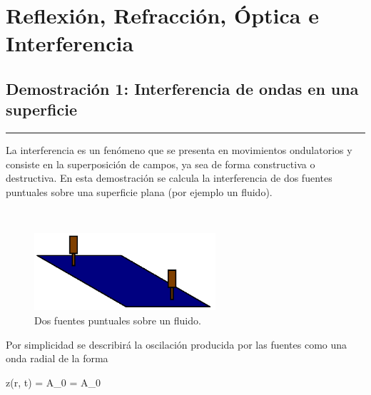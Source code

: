 \chapter{Reflexión, Refracción, Óptica e Interferencia}
\label{cha:optic}





\section{Demostración 1: Interferencia de ondas en una superficie}
\label{sec:DEMO4_01}
\rule{14cm}{0.5mm}

La interferencia es un fenómeno que se presenta en movimientos ondulatorios
y consiste en la superposición de campos, ya sea de forma constructiva o 
destructiva. En esta demostración se calcula la interferencia de dos fuentes
puntuales sobre una superficie plana (por ejemplo un fluido).


\
\begin{figure}[htbp]
	\centering
	\includegraphics[width=0.60\textwidth]
	{./pictures/interference.png}

	\caption{\small{Dos fuentes puntuales sobre un fluido.}}
	
	\label{fig:doppler}
\end{figure}


Por simplicidad se describirá la oscilación producida por las fuentes como
una onda radial de la forma

{z(r, t) = A_0\sin{} = A_0\sin{}}

